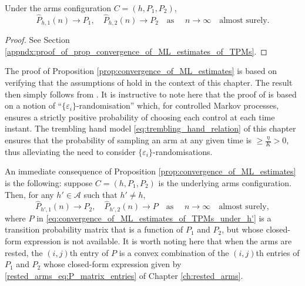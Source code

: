 \begin{prop}
	\label{prop:convergence_of_ML_estimates}
	Under the arms configuration $C=(h, P_1, P_2)$,
	\begin{equation}
		\hat{P}_{h, 1}(n)\longrightarrow P_1, \quad \hat{P}_{h, 2}(n)\longrightarrow P_2\quad \text{as }\quad n\to \infty \quad \text{almost surely.}
		\label{eq:convergence_of_ML_estimates_of_TPMs}
	\end{equation}
\end{prop}
\begin{proof}
See Section \ref{appndx:proof_of_prop_convergence_of_ML_estimates_of_TPMs}.	
\end{proof}
The proof of Proposition \ref{prop:convergence_of_ML_estimates} is based on verifying that the assumptions of \cite{borkar1982identification} hold in the context of this chapter. The result then simply follows from \cite[Theorem 4.3]{borkar1982identification}. It is instructive to note here that the proof of \cite[Theorem 4.3]{borkar1982identification} is based on a notion of ``$\{\varepsilon_i\}$-randomisation'' which, for controlled Markov processes, ensures a strictly positive probability of choosing each  control at each time instant. The trembling hand model \eqref{eq:trembling_hand_relation} of this chapter ensures that the probability of sampling an arm at any given time is $\geq \frac{\eta}{K}>0$, thus alleviating the need to consider $\{\varepsilon_i\}$-randomisations.

An immediate consequence of Proposition \ref{prop:convergence_of_ML_estimates} is the following: suppose $C=(h, P_1, P_2)$ is the underlying arms configuration. Then, for any $h'\in \mathcal{A}$ such that $h'\neq h$,
\begin{equation}
	\hat{P}_{h', 1}(n)\longrightarrow P_2, \quad \hat{P}_{h', 2}(n)\longrightarrow P\quad \text{as }\quad n\to \infty \quad \text{almost surely},
		\label{eq:convergence_of_ML_estimates_of_TPMs_under_h'}
\end{equation}
where $P$ in \eqref{eq:convergence_of_ML_estimates_of_TPMs_under_h'} is a transition probability matrix that is a function of $P_1$ and $P_2$, but whose closed-form expression is not available. It is worth noting here that when the arms are rested, the $(i, j)$th entry of $P$ is a convex combination of the $(i, j)$th entries of $P_1$ and $P_2$ whose closed-form expression given by \eqref{rested_arms_eq:P_matrix_entries} of Chapter \ref{ch:rested_arms}.

